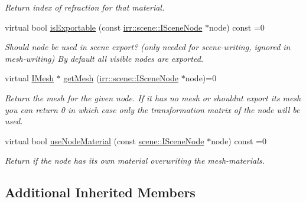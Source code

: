 \begin{DoxyCompactItemize}
\begin{DoxyCompactList}\small\item\em Return index of refraction for that material. \end{DoxyCompactList}\item 
\mbox{\label{classirr_1_1scene_1_1IColladaMeshWriterProperties_af24d1c12b3f4168407c078bd7fc3dc82}} 
virtual bool \hyperlink{classirr_1_1scene_1_1IColladaMeshWriterProperties_af24d1c12b3f4168407c078bd7fc3dc82}{is\+Exportable} (const \hyperlink{classirr_1_1scene_1_1ISceneNode}{irr\+::scene\+::\+I\+Scene\+Node} $\ast$node) const =0
\begin{DoxyCompactList}\small\item\em Should node be used in scene export? (only needed for scene-\/writing, ignored in mesh-\/writing) By default all visible nodes are exported. \end{DoxyCompactList}\item 
\mbox{\label{classirr_1_1scene_1_1IColladaMeshWriterProperties_ac6d9e1583642ac777471bd9225d72007}} 
virtual \hyperlink{classirr_1_1scene_1_1IMesh}{I\+Mesh} $\ast$ \hyperlink{classirr_1_1scene_1_1IColladaMeshWriterProperties_ac6d9e1583642ac777471bd9225d72007}{get\+Mesh} (\hyperlink{classirr_1_1scene_1_1ISceneNode}{irr\+::scene\+::\+I\+Scene\+Node} $\ast$node)=0
\begin{DoxyCompactList}\small\item\em Return the mesh for the given node. If it has no mesh or shouldn\textquotesingle{}t export it\textquotesingle{}s mesh you can return 0 in which case only the transformation matrix of the node will be used. \end{DoxyCompactList}\item 
virtual bool \hyperlink{classirr_1_1scene_1_1IColladaMeshWriterProperties_a9c10df4dc3602efbba6a47b34e2f8f4b}{use\+Node\+Material} (const \hyperlink{classirr_1_1scene_1_1ISceneNode}{scene\+::\+I\+Scene\+Node} $\ast$node) const =0
\begin{DoxyCompactList}\small\item\em Return if the node has it\textquotesingle{}s own material overwriting the mesh-\/materials. \end{DoxyCompactList}\end{DoxyCompactItemize}
\subsection*{Additional Inherited Members}


